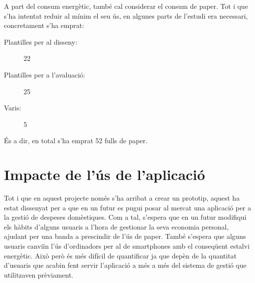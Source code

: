 A part del consum energètic, també cal considerar el consum de paper. Tot i que s'ha intentat reduir al mínim el seu ús, en algunes parts de l'estudi era necessari, concretament s'ha emprat:

\begin{description}
\item[Plantilles per al disseny:] 22 
\item[Plantilles per a l'avaluació:] 25
\item[Varis:] 5
\end{description}

És a dir, en total s'ha emprat 52 fulls de paper.

\section{Impacte de l'ús de l'aplicació}
Tot i que en aquest projecte només s'ha arribat a crear un prototip, aquest ha estat dissenyat per a que en un futur es pugui posar al mercat una aplicació per a la gestió de despeses domèstiques. Com a tal, s'espera que en un futur modifiqui els hàbits d'alguns usuaris a l'hora de gestionar la seva economia personal, ajudant per una banda a prescindir de l'ús de paper. També s'espera que alguns usuaris canviïn l'ús d'ordinadors per al de \glspl{smartphone} amb el conseqüent estalvi energètic. Això però és més difícil de quantificar ja que depèn de la quantitat d'usuaris que acabin fent servir l'aplicació a més a més del sistema de gestió que utilitzaven prèviament. 
